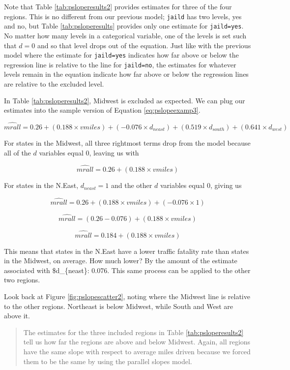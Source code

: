 \documentclass[
]{book}
\begin{document}
Note that Table \ref{tab:psloperesults2} provides estimates for three of the four regions. This is no different from our previous model; \texttt{jaild} has two levels, yes and no, but Table \ref{tab:psloperesults} provides only one estimate for \texttt{jaild=yes}. No matter how many levels in a categorical variable, one of the levels is set such that \(d=0\) and so that level drops out of the equation. Just like with the previous model where the estimate for \texttt{jaild=yes}
indicates how far above or below the regression line is relative to the line for \texttt{jaild=no}, the estimates for whatever levels remain in the equation indicate how far above or below the regression lines are relative to the excluded level.

In Table \ref{tab:psloperesults2}, Midwest is excluded as expected. We can plug our estimates into the sample version of Equation \eqref{eq:pslopeexamp3}.

\[\hat{mrall} = 0.26 + (0.188 \times vmiles) + (-0.076 \times d_{neast}) + (0.519 \times d_{south}) + (0.641 \times d_{west})\]

For states in the Midwest, all three rightmost terms drop from the model because all of the \(d\) variables equal 0, leaving us with

\[\hat{mrall} = 0.26 + (0.188 \times vmiles)\]

For states in the N.East, \(d_{neast}=1\) and the other \(d\) variables equal 0, giving us

\[\hat{mrall} = 0.26 + (0.188 \times vmiles) + (-0.076 \times 1)\]

\[\hat{mrall} = (0.26 - 0.076) + (0.188 \times vmiles)\]

\[\hat{mrall} = 0.184 + (0.188 \times vmiles)\]

This means that states in the N.East have a lower traffic fatality rate than states in the Midwest, on average. How much lower? By the amount of the estimate associated with \$d\_\{neast\}: 0.076. This same process can be applied to the other two regions.

Look back at Figure \ref{fig:pslopescatter2}, noting where the Midwest line is relative to the other regions. Northeast is below Midwest, while South and West are above it.

\begin{quote}
The estimates for the three included regions in Table \ref{tab:psloperesults2} tell us how far the regions are above and below Midwest. Again, all regions have the same slope with respect to average miles driven because we forced them to be the same by using the parallel slopes model.
\end{quote}
\end{document}
